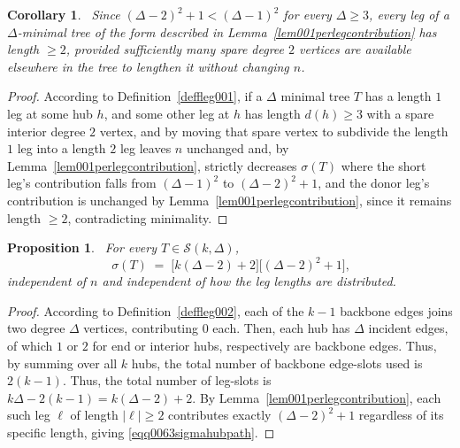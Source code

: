 \documentclass[12pt]{amsart}
\newtheorem{proposition}[theorem]{Proposition}
\newtheorem{corollary}[theorem]{Corollary}
\begin{document}
\begin{corollary}~\label{cor04legslength2}
Since $(\Delta-2)^2+1 < (\Delta-1)^2$ for every $\Delta\ge3$, every leg of a $\Delta$-minimal tree of the
form described in Lemma~\ref{lem001perlegcontribution} has length $\geqslant 2$, provided sufficiently many spare degree $2$ vertices are available elsewhere in the tree to lengthen it without changing $n$.
\end{corollary}
\begin{proof}
According to Definition~\ref{deffleg001}, if a $\Delta$ minimal tree $T$ has a length $1$ leg at some hub $h$, and some other leg at $h$   has length $d(h)\geqslant 3$ with a spare interior degree $2$ vertex, and by moving that spare vertex to subdivide the length $1$ leg into a length $2$ leg leaves $n$ unchanged and, by
Lemma~\ref{lem001perlegcontribution}, strictly decreases $\sigma(T)$ where the
short leg's contribution falls from $(\Delta-1)^2$ to $(\Delta-2)^2+1$, and the donor leg's contribution is unchanged by
Lemma~\ref{lem001perlegcontribution}, since it remains length $\geqslant 2$, contradicting minimality.
\end{proof}



\begin{proposition}~\label{prophubpathsigma603}
For every $T\in\mathcal S(k,\Delta)$,
\begin{equation}~\label{eqq0063sigmahubpath}
\sigma(T) \;=\; \big[k(\Delta-2)+2\big]\big[(\Delta-2)^2+1\big],
\end{equation}
independent of $n$ and independent of how the leg lengths are distributed.
\end{proposition}
\begin{proof}
According to Definition~\ref{deffleg002}, each of the $k-1$ backbone edges joins two degree $\Delta$ vertices,
contributing $0$ each. Then, each hub has $\Delta$ incident edges, of which $1$ or
$2$ for end or interior hubs, respectively are backbone edges. Thus, by summing over
all $k$ hubs, the total number of backbone edge-slots used is $2(k-1)$. Thus, the total number of leg-slots is
$k\Delta - 2(k-1) = k(\Delta-2)+2$. By Lemma~\ref{lem001perlegcontribution}, each such leg $\ell$ of length $|\ell|\geqslant 2$ contributes exactly $(\Delta-2)^2+1$ regardless of its specific length, giving  \eqref{eqq0063sigmahubpath}.
\end{proof}
\end{document}
